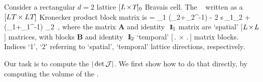 Consider a rectangular $d=2$ lattice
${[{L_{}}\!\times\!{T_{}}]_{0}}$ Bravais cell. The \jacobianOrb\
 written as a
$[{L_{}}{T_{}}\times{\ensuremath{L_{}}}{\ensuremath{T_{}}}]$ Kronecker product block
matrix is
\beq
\jMorb
=
\id_{1} \otimes \left(\hopMat_{2}+\hopMat_{2}^{-1}\right)
-
2 {s}\,\id_1\otimes\id_{2}
+
\left(\hopMat_{1}+\hopMat_{1}^{-1}\right) \otimes \id_{2}
\,,
where the  matrix $\mathbf{A}$ and identity
${\ \hbox{{\rm 1}\kern-.62em\hbox{\rm 1}}}_1$ matrix are `spatial' [${L_{}}\!\times\!{L_{}}$]
matrices, with blocks $\mathbf{B}$ and identity ${\ \hbox{{\rm 1}\kern-.62em\hbox{\rm 1}}}_2$ `temporal'
[$\period{}\!\times\!\period{}$] matrix blocks. Indices `1', `2'
referring to `spatial', `temporal' lattice directions, respectively.

Our task is to compute the {\HillDet} $|\det {\ensuremath{\mathcal{J}}}|$. We first show how
to do that directly, by computing the volume of the {\fundPip}.

